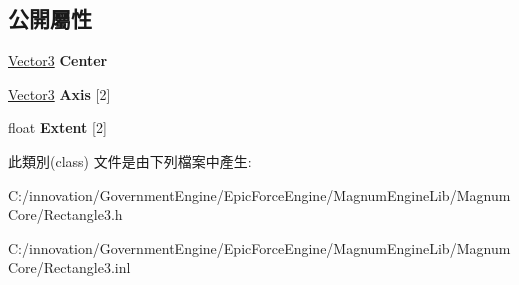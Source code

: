 \subsection*{公開屬性}
\begin{DoxyCompactItemize}
\item 
\hyperlink{class_i_dream_sky_1_1_vector3}{Vector3} {\bfseries Center}\hypertarget{class_i_dream_sky_1_1_rectangle3_a259683885d925bac61a098cb8a72bf79}{}\label{class_i_dream_sky_1_1_rectangle3_a259683885d925bac61a098cb8a72bf79}

\item 
\hyperlink{class_i_dream_sky_1_1_vector3}{Vector3} {\bfseries Axis} \mbox{[}2\mbox{]}\hypertarget{class_i_dream_sky_1_1_rectangle3_a697e47c36ba5b1bad65eb92cd73f5b95}{}\label{class_i_dream_sky_1_1_rectangle3_a697e47c36ba5b1bad65eb92cd73f5b95}

\item 
float {\bfseries Extent} \mbox{[}2\mbox{]}\hypertarget{class_i_dream_sky_1_1_rectangle3_a3c6b403ce198b8a32a1841f8d38f16f1}{}\label{class_i_dream_sky_1_1_rectangle3_a3c6b403ce198b8a32a1841f8d38f16f1}

\end{DoxyCompactItemize}


此類別(class) 文件是由下列檔案中產生\+:\begin{DoxyCompactItemize}
\item 
C\+:/innovation/\+Government\+Engine/\+Epic\+Force\+Engine/\+Magnum\+Engine\+Lib/\+Magnum\+Core/Rectangle3.\+h\item 
C\+:/innovation/\+Government\+Engine/\+Epic\+Force\+Engine/\+Magnum\+Engine\+Lib/\+Magnum\+Core/Rectangle3.\+inl\end{DoxyCompactItemize}
